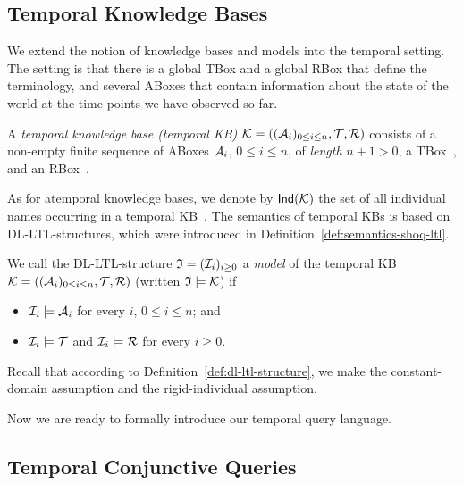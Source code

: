 \subsection{Temporal Knowledge Bases}\label{sec:tkbs}

We extend the notion of knowledge bases and models into the temporal setting.
The setting is that there is a global TBox and a global RBox that define the
terminology, and several ABoxes that contain information about the state of the
world at the time points we have observed so far.

\begin{definition}\label{def:syntax-tkb}
    A \emph{temporal knowledge base (temporal KB)}
    $\mathcal{K}=((\mathcal{A}_i)_{0\le i\le n},\mathcal{T},\mathcal{R})$ consists of a non-empty
    finite sequence of ABoxes $\mathcal{A}_i$, $0\le i\le n$, of \emph{length}
    $n+1>0$, a TBox~\Tmc, and an RBox~\Rmc.
\end{definition}

\noindent
As for atemporal knowledge bases, we denote by $\mathsf{Ind}(\mathcal{K})$ the set of all
individual names occurring in a temporal KB~\Kmc.
%
The semantics of temporal KBs is based on DL-LTL-structures, which were introduced in
Definition~\ref{def:semantics-shoq-ltl}.

\begin{definition}\label{def:semantics-tkb}
    We call the DL-LTL-structure $\mathfrak{I}=(\mathcal{I}_i)_{i\ge 0}$ a \emph{model} of the
    temporal KB $\mathcal{K}=((\mathcal{A}_i)_{0\le i\le n},\mathcal{T},\mathcal{R})$ (written
    $\mathfrak{I}\models\mathcal{K}$) if
    \begin{itemize}
        \item $\mathcal{I}_i\models\mathcal{A}_i$ for every $i$, $0\le i\le n$; and
        \item $\mathcal{I}_i\models\mathcal{T}$ and $\mathcal{I}_i\models\mathcal{R}$ for every $i\ge 0$.
    \end{itemize}
\end{definition}

\noindent
Recall that according to Definition~\ref{def:dl-ltl-structure}, we make the
constant-domain assumption and the rigid-individual assumption.

Now we are ready to formally introduce our temporal query language.


\subsection{Temporal Conjunctive Queries}\label{sec:tcqs}

